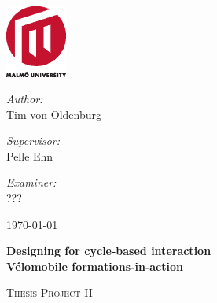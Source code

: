 \begin{titlepage}


\begin{center}

\AddToShipoutPicture*{\BackgroundPic}

\includegraphics[width=0.15\textwidth]{mah2.eps}~\\[1cm]

\vspace*{1.5cm}

\begin{minipage}{0.43\textwidth}
\begin{flushleft} \large
\emph{Author:}\\
Tim von Oldenburg
\end{flushleft}
\end{minipage}
\begin{minipage}{0.43\textwidth}
\begin{flushright} \large
\emph{Supervisor:} \\
Pelle Ehn
\end{flushright}
\end{minipage}

\vspace*{0.4cm}

\begin{minipage}{0.86\textwidth}
\begin{flushright} \large
\emph{Examiner:} \\
???
\end{flushright}
\end{minipage}

\vspace*{3.5cm}

{\large \today}

\vfill
\begin{minipage}{0.86\textwidth}
\begin{flushleft} \large

\vspace*{0.4cm}
\begin{spacing}{1.0}
{ \huge \bfseries Designing for cycle-based interaction\\[0.4cm]\large{Vélomobile formations-in-action}}
\end{spacing}
\vspace*{1.5cm}
\textsc{\Large Thesis Project II}
\end{flushleft}
\end{minipage}




\end{center}
\end{titlepage}
